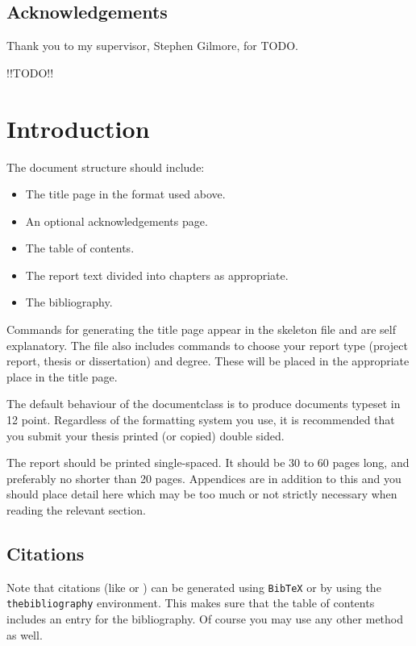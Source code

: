 \documentclass[bsc,frontabs,twoside,singlespacing,parskip,deptreport]{infthesis}     %
\begin{document}
\maketitle

\section*{Acknowledgements}
Thank you to my supervisor, Stephen Gilmore, for TODO.

!!TODO!!

\tableofcontents



\chapter{Introduction}

The document structure should include:
\begin{itemize}
\item
The title page  in the format used above.
\item
An optional acknowledgements page.
\item
The table of contents.
\item
The report text divided into chapters as appropriate.
\item
The bibliography.
\end{itemize}

Commands for generating the title page appear in the skeleton file and
are self explanatory.
The file also includes commands to choose your report type (project
report, thesis or dissertation) and degree.
These will be placed in the appropriate place in the title page.

The default behaviour of the documentclass is to produce documents typeset in
12 point.  Regardless of the formatting system you use,
it is recommended that you submit your thesis printed (or copied)
double sided.

The report should be printed single-spaced.
It should be 30 to 60 pages long, and preferably no shorter than 20 pages.
Appendices are in addition to this and you should place detail
here which may be too much or not strictly necessary when reading the relevant section.

\section{Citations}

Note that citations
(like \cite{P1} or \cite{P2})
can be generated using {\tt BibTeX} or by using the
{\tt thebibliography} environment. This makes sure that the
table of contents includes an entry for the bibliography.
Of course you may use any other method as well.
\end{document}
